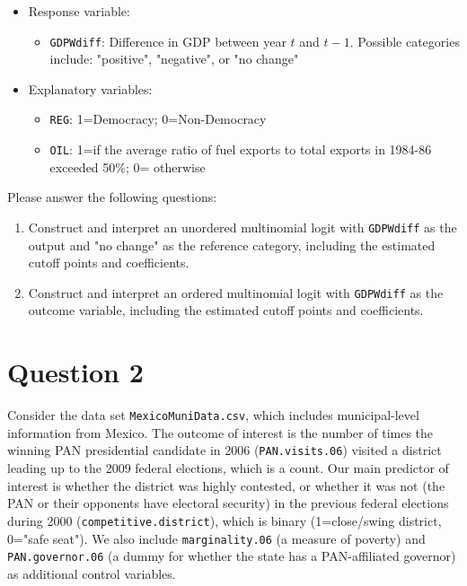 \documentclass[12pt,letterpaper]{article}
\begin{document}
\begin{itemize}
	\item
	Response variable: 
	\begin{itemize}
		\item \texttt{GDPWdiff}: Difference in GDP between year $t$ and $t-1$. Possible categories include: "positive", "negative", or "no change"
	\end{itemize}
	\item
	Explanatory variables: 
	\begin{itemize}
		\item
		\texttt{REG}: 1=Democracy; 0=Non-Democracy
		\item
		\texttt{OIL}: 1=if the average ratio of fuel exports to total exports in 1984-86 exceeded 50\%; 0= otherwise
	\end{itemize}
	
\end{itemize}
\newpage
\noindent Please answer the following questions:

\begin{enumerate}
	\item Construct and interpret an unordered multinomial logit with \texttt{GDPWdiff} as the output and "no change" as the reference category, including the estimated cutoff points and coefficients.
	\item Construct and interpret an ordered multinomial logit with \texttt{GDPWdiff} as the outcome variable, including the estimated cutoff points and coefficients.
	
	
\end{enumerate}

\section*{Question 2} 
\vspace{.25cm}

\noindent Consider the data set \texttt{MexicoMuniData.csv}, which includes municipal-level information from Mexico. The outcome of interest is the number of times the winning PAN presidential candidate in 2006 (\texttt{PAN.visits.06}) visited a district leading up to the 2009 federal elections, which is a count. Our main predictor of interest is whether the district was highly contested, or whether it was not (the PAN or their opponents have electoral security) in the previous federal elections during 2000 (\texttt{competitive.district}), which is binary (1=close/swing district, 0="safe seat"). We also include \texttt{marginality.06} (a measure of poverty) and \texttt{PAN.governor.06} (a dummy for whether the state has a PAN-affiliated governor) as additional control variables. 
\end{document}
